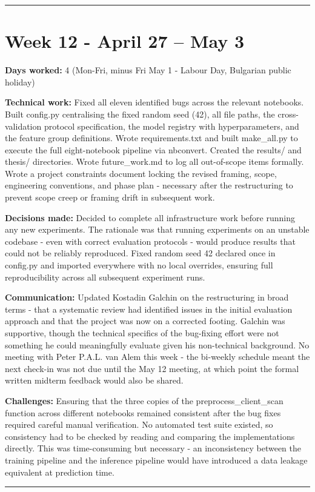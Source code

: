 \documentclass[11pt,a4paper]{article}
\begin{document}
\noindent\rule{\textwidth}{0.4pt}


\section{Week 12  -  April 27 – May 3}

\textbf{Days worked:} 4 (Mon-Fri, minus Fri May 1 - Labour Day, Bulgarian public holiday)

\textbf{Technical work:} Fixed all eleven identified bugs across the relevant notebooks. Built config.py centralising the fixed random seed (42), all file paths, the cross-validation protocol specification, the model registry with hyperparameters, and the feature group definitions. Wrote requirements.txt and built make\_all.py to execute the full eight-notebook pipeline via nbconvert. Created the results/ and thesis/ directories. Wrote future\_work.md to log all out-of-scope items formally. Wrote a project constraints document locking the revised framing, scope, engineering conventions, and phase plan  -  necessary after the restructuring to prevent scope creep or framing drift in subsequent work.

\textbf{Decisions made:} Decided to complete all infrastructure work before running any new experiments. The rationale was that running experiments on an unstable codebase  -  even with correct evaluation protocols  -  would produce results that could not be reliably reproduced. Fixed random seed 42 declared once in config.py and imported everywhere with no local overrides, ensuring full reproducibility across all subsequent experiment runs.

\textbf{Communication:} Updated Kostadin Galchin on the restructuring in broad terms  -  that a systematic review had identified issues in the initial evaluation approach and that the project was now on a corrected footing. Galchin was supportive, though the technical specifics of the bug-fixing effort were not something he could meaningfully evaluate given his non-technical background. No meeting with Peter P.A.L. van Alem this week  -  the bi-weekly schedule meant the next check-in was not due until the May 12 meeting, at which point the formal written midterm feedback would also be shared.

\textbf{Challenges:} Ensuring that the three copies of the preprocess\_client\_scan function across different notebooks remained consistent after the bug fixes required careful manual verification. No automated test suite existed, so consistency had to be checked by reading and comparing the implementations directly. This was time-consuming but necessary  -  an inconsistency between the training pipeline and the inference pipeline would have introduced a data leakage equivalent at prediction time.
\noindent\rule{\textwidth}{0.4pt}
\end{document}
